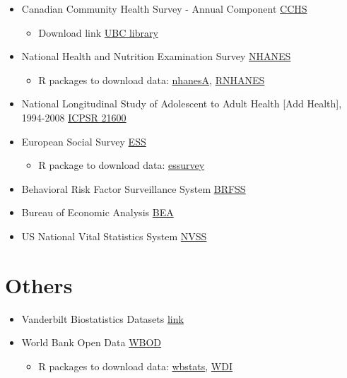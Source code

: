 \documentclass[
]{book}
\providecommand{\tightlist}{%
  \setlength{\itemsep}{0pt}\setlength{\parskip}{0pt}}
\begin{document}
\begin{itemize}
\tightlist
\item
  Canadian Community Health Survey - Annual Component \href{https://www150.statcan.gc.ca/n1/en/catalogue/11-625-X}{CCHS}

  \begin{itemize}
  \tightlist
  \item
    Download link \href{http://dvn.library.ubc.ca/}{UBC library}
  \end{itemize}
\item
  National Health and Nutrition Examination Survey \href{https://www.cdc.gov/nchs/nhanes/index.htm}{NHANES}

  \begin{itemize}
  \tightlist
  \item
    R packages to download data: \href{https://cran.r-project.org/web/packages/nhanesA/vignettes/Introducing_nhanesA.html}{nhanesA}, \href{https://cran.r-project.org/web/packages/RNHANES/vignettes/introduction.html}{RNHANES}
  \end{itemize}
\item
  National Longitudinal Study of Adolescent to Adult Health {[}Add Health{]}, 1994-2008 \href{http://www.icpsr.umich.edu/icpsrweb/DSDR/studies/21600}{ICPSR 21600}
\item
  European Social Survey \href{http://www.europeansocialsurvey.org/}{ESS}

  \begin{itemize}
  \tightlist
  \item
    R package to download data: \href{https://cran.r-project.org/web/packages/essurvey/vignettes/intro_ess.html}{essurvey}
  \end{itemize}
\item
  Behavioral Risk Factor Surveillance System \href{https://www.cdc.gov/brfss/data_documentation/index.htm}{BRFSS}
\item
  Bureau of Economic Analysis \href{http://www.bea.gov/}{BEA}
\item
  US National Vital Statistics System \href{https://www.cdc.gov/nchs/nvss/vsrr.htm}{NVSS}
\end{itemize}

\hypertarget{others}{%
\section{Others}\label{others}}

\begin{itemize}
\tightlist
\item
  Vanderbilt Biostatistics Datasets \href{http://biostat.mc.vanderbilt.edu/wiki/Main/DataSets}{link}
\item
  World Bank Open Data \href{https://data.worldbank.org/}{WBOD}

  \begin{itemize}
  \tightlist
  \item
    R packages to download data: \href{https://cran.r-project.org/web/packages/wbstats/vignettes/Using_the_wbstats_package.html}{wbstats}, \href{https://cran.r-project.org/web/packages/WDI/index.html}{WDI}
  \end{itemize}
\end{itemize}
\end{document}
